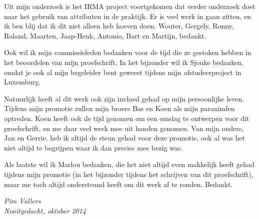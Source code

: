 Uit mijn onderzoek is het IRMA project voortgekomen dat verder onderzoek doet
naar het gebruik van attributen in de praktijk. Er is veel werk in gaan zitten,
en ik ben blij dat ik dit niet alleen heb hoeven doen. Wouter, Gergely, Ronny,
Roland, Maarten, Jaap-Henk, Antonio, Bart en Martijn, bedankt.

Ook wil ik mijn commissieleden bedanken voor de tijd die ze gestoken hebben in 
het beoordelen van mijn proefschrift. In het bijzonder wil ik Sjouke bedanken, 
omdat je ook al mijn begeleider bent geweest tijdens mijn afstudeerproject in 
Luxemburg.

Natuurlijk heeft al dit werk ook zijn invloed gehad op mijn persoonlijke leven.
Tijdens mijn promotie zullen mijn broers Bas en Koen als mijn paranimfen 
optreden. Koen heeft ook de tijd genomen om een omslag te ontwerpen voor dit
proefschrift, en me daar veel werk mee uit handen genomen. Van mijn ouders,
Jan en Gerrie, heb ik altijd de steun gehad voor deze promotie, ook al was het
niet altijd te begrijpen waar ik dan precies mee bezig was. 

Als laatste wil ik Marlou bedanken, die het niet altijd even makkelijk heeft 
gehad tijdens mijn promotie (in het bijzonder tijdens het schrijven van dit 
proefschrift), maar me toch altijd ondersteund heeft om dit werk af te ronden. 
Bedankt.

\begin{flushright}
  \textit{Pim Vullers\\ Nooitgedacht, oktober 2014}
\end{flushright}

\cleardoublepage
